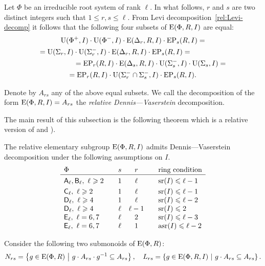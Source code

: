 Let $\Phi$ be an irreducible root system of rank $\ell$.
In what follows, $r$ and $s$ are two distinct integers such that $1 \leq r, s \leq \ell$.
From Levi decomposition~\ref{rel:Levi-decomp} it follows that the following four subsets of $\operatorname{E}(\Phi, R, I)$ are equal:
\begin{multline*}
\operatorname{U}(\Phi^+, I)\cdot \operatorname{U}(\Phi^-, I) \cdot \operatorname{E}(\Delta_r, R, I) \cdot \operatorname{EP}_s(R, I) = \\
= \operatorname{U}(\Sigma_r, I)\cdot \operatorname{U}(\Sigma^-_r, I) \cdot \operatorname{E}(\Delta_r, R, I) \cdot \operatorname{EP}_s(R, I) = \hspace{5em} \\
\hspace{5em} = \operatorname{EP}_r(R, I) \cdot \operatorname{E}(\Delta_s, R, I) \cdot \operatorname{U}(\Sigma_s^-, I)\cdot \operatorname{U}(\Sigma_s, I) = \\
= \operatorname{EP}_r(R, I) \cdot \operatorname{U}(\Sigma^-_r \cap \Sigma^-_s, I) \cdot \operatorname{EP}_s(R, I).
\end{multline*}

\begin{dfn}
 Denote by $A_{rs}$ any of the above equal subsets.
 We call the decomposition of the form $\operatorname{E}(\Phi, R, I) = A_{rs}$ the {\it relative Dennis---Vaserstein} decomposition.
\end{dfn}

The main result of this subsection is the following theorem which is a relative version of \cite[Lemma~2.1]{ST76} and \cite[Theorem~2.5]{St78}).
\begin{thm}\label{thm:DennisVaserstein}
The relative elementary subgroup $\operatorname{E}(\Phi, R, I)$ admits Dennis---Vaserstein decomposition under the following assumptions on $I$.
\[\begin{array}{l@{\qquad}c@{\quad}c@{\qquad}l}
\Phi & s & r & \text{ring condition} \\ \hline\vphantom{\Bigl(}
\rA_\ell, \rB_\ell,\ \ell\geqslant 2 & 1 & \ell & \sr(I) \leqslant \ell-1 \\     
\rC_\ell,\ \ell \geqslant 2          & 1 & \ell & \sr(I) \leqslant \ell-1 \\
\rD_\ell,\ \ell\geqslant 4           & 1 & \ell & \sr(I) \leqslant \ell-2 \\ 
\rD_\ell,\ \ell\geqslant 4           & \ell & \ell-1 & \sr(I) \leqslant 2 \\
\rE_\ell,\ \ell=6,7             & \ell & 2 & \sr(I) \leqslant \ell-3 \\ 
\rE_\ell,\ \ell=6,7             & \ell & 1 & \asr(I)\leqslant \ell-2
\end{array}\]
\end{thm}
Consider the following two submonoids of $\operatorname{E}(\Phi, R)$:
\[ N_{rs} = \left\{ g\in \operatorname{E}(\Phi, R)\ \middle|\ g \cdot A_{rs} \cdot g^{-1} \subseteq A_{rs} \right\}, \quad
   L_{rs}=  \left\{ g\in \operatorname{E}(\Phi, R, I)\ \middle|\ g \cdot A_{rs} \subseteq A_{rs} \right\}. \]

